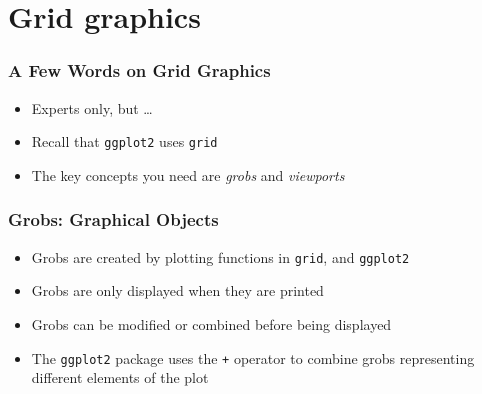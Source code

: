 \documentclass[xcolor=svgnames]{beamer}
\newcommand{\code}[1]{\texttt{#1}}
\let\overbatim\verbatim
\let\endoverbatim\endverbatim
\newenvironment{vcode}%
{\bgroup\baselineskip=0.8\baselineskip\overbatim}%
{\endoverbatim\egroup}
\begin{document}



\section{Grid graphics}

\begin{frame}
  \frametitle{A Few Words on Grid Graphics}

  \begin{itemize}
  \item Experts only, but \dots
  \item Recall that \code{ggplot2} uses \code{grid}
  \item The key concepts you need are {\em grobs} and {\em viewports}
  \end{itemize}

\end{frame}

\begin{frame}
  \frametitle{Grobs: Graphical Objects}

  \begin{itemize}
  \item Grobs are created by plotting functions in \code{grid}, and \code{ggplot2}
  \item Grobs are only displayed when they are printed
  \item Grobs can be modified or combined before being displayed
  \item The \code{ggplot2} package uses the \code{+} operator to combine
        grobs representing different elements of the plot
  \end{itemize}

\end{frame}
\end{document}

